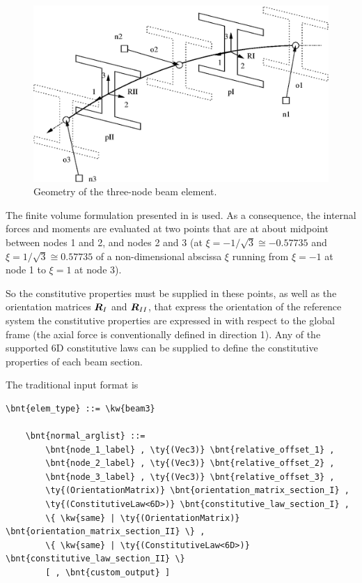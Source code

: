 \begin{figure}
\centering
{}
\includegraphics[width=.7\textwidth]{beam3}
\caption{Geometry of the three-node beam element.}
\label{fig:EL:BEAM:beam3}
\end{figure}

The finite volume formulation presented in \cite{FV-AIAA} is used.
As a consequence, the internal forces and moments are evaluated 
at two points that are at about midpoint between nodes 1 and 2, 
and nodes 2 and 3 (at $ \xi=-1/\sqrt{3}\cong -0.57735 $
and $\xi=1/\sqrt{3} \cong 0.57735$ of a non-dimensional abscissa $\xi$
running from $\xi=-1$ at node 1 to $\xi=1$ at node 3).

So the constitutive properties must be supplied in these points, as well as
the orientation matrices $\boldsymbol{R}_I$ and $\boldsymbol{R}_{II}$,
that express the orientation of the reference system
the constitutive properties are expressed in with respect to the global frame
(the axial force is conventionally defined in direction 1).
Any of the supported 6D constitutive laws can be supplied to define the
constitutive properties of each beam section.

The traditional input format is
\begin{Verbatim}[commandchars=\\\{\}]
    \bnt{elem_type} ::= \kw{beam3}

    \bnt{normal_arglist} ::=
        \bnt{node_1_label} , \ty{(Vec3)} \bnt{relative_offset_1} ,
        \bnt{node_2_label} , \ty{(Vec3)} \bnt{relative_offset_2} ,
        \bnt{node_3_label} , \ty{(Vec3)} \bnt{relative_offset_3} ,
        \ty{(OrientationMatrix)} \bnt{orientation_matrix_section_I} ,
        \ty{(ConstitutiveLaw<6D>)} \bnt{constitutive_law_section_I} ,
        \{ \kw{same} | \ty{(OrientationMatrix)} \bnt{orientation_matrix_section_II} \} ,
        \{ \kw{same} | \ty{(ConstitutiveLaw<6D>)} \bnt{constitutive_law_section_II} \}
        [ , \bnt{custom_output} ]
\end{Verbatim}

